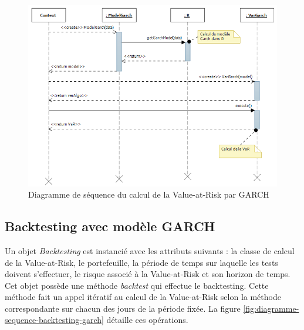 \documentclass[a4paper]{report}
\begin{document}
\begin{figure}
  	\center
  	\includegraphics[width=1\textwidth]{diagSeqGarch.png}
  	\caption{Diagramme de séquence du calcul de la Value-at-Risk par GARCH}
    \label{fig:diagramme-sequence-var-garch}
\end{figure}


\subsection{Backtesting avec modèle GARCH}
\label{backtesting-modele-garch}

Un objet \textit{Backtesting} est instancié avec les attributs suivants : la classe de calcul de la Value-at-Risk, le portefeuille, la période de temps sur laquelle les tests doivent s'effectuer, le risque associé à la Value-at-Risk et son horizon de temps.
Cet objet possède une méthode \textit{backtest} qui effectue le backtesting.
Cette méthode fait un appel itératif au calcul de la Value-at-Risk selon la méthode correspondante sur chacun des jours de la période fixée.
La figure \ref{fig:diagramme-sequence-backtesting-garch} détaille ces opérations.
\end{document}
